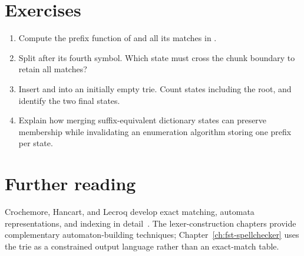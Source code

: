 \section{Exercises}
\label{sec:ch78-exercises}
\begin{enumerate}
\item\label{ex:ch78-prefix} Compute the prefix function of  and all its matches in .
\item\label{ex:ch78-stream} Split  after its fourth symbol.
Which state must cross the chunk boundary to retain all  matches?
\item\label{ex:ch78-trie} Insert  and  into an initially empty trie.
Count states including the root, and identify the two final states.
\item\label{ex:ch78-merge} Explain how merging suffix-equivalent dictionary states can preserve membership while invalidating an enumeration algorithm storing one prefix per state.
\end{enumerate}

\section{Further reading}
\label{sec:ch78-reading}
Crochemore, Hancart, and Lecroq develop exact matching, automata representations, and indexing in detail~\cite{crochemore-2007-strings}.
The lexer-construction chapters provide complementary automaton-building techniques; Chapter~\ref{ch:fst-spellchecker} uses the trie as a constrained output language rather than an exact-match table.
